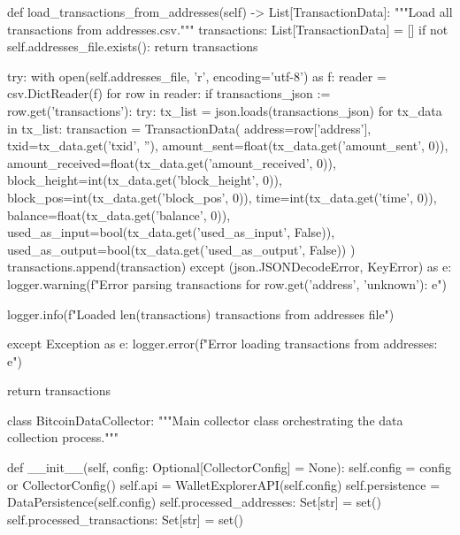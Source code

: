 \begin{codelisting}[language=Python, caption=Основной скрипт сбора данных]
    def load_transactions_from_addresses(self) -> List[TransactionData]:
        """Load all transactions from addresses.csv."""
        transactions: List[TransactionData] = []
        if not self.addresses_file.exists():
            return transactions
            
        try:
            with open(self.addresses_file, 'r', encoding='utf-8') as f:
                reader = csv.DictReader(f)
                for row in reader:
                    if transactions_json := row.get('transactions'):
                        try:
                            tx_list = json.loads(transactions_json)
                            for tx_data in tx_list:
                                transaction = TransactionData(
                                    address=row['address'],
                                    txid=tx_data.get('txid', ''),
                                    amount_sent=float(tx_data.get('amount_sent', 0)),
                                    amount_received=float(tx_data.get('amount_received', 0)),
                                    block_height=int(tx_data.get('block_height', 0)),
                                    block_pos=int(tx_data.get('block_pos', 0)),
                                    time=int(tx_data.get('time', 0)),
                                    balance=float(tx_data.get('balance', 0)),
                                    used_as_input=bool(tx_data.get('used_as_input', False)),
                                    used_as_output=bool(tx_data.get('used_as_output', False))
                                )
                                transactions.append(transaction)
                        except (json.JSONDecodeError, KeyError) as e:
                            logger.warning(f"Error parsing transactions for {row.get('address', 'unknown')}: {e}")
                            
            logger.info(f"Loaded {len(transactions)} transactions from addresses file")
            
        except Exception as e:
            logger.error(f"Error loading transactions from addresses: {e}")
            
        return transactions


class BitcoinDataCollector:
    """Main collector class orchestrating the data collection process."""
    
    def __init__(self, config: Optional[CollectorConfig] = None):
        self.config = config or CollectorConfig()
        self.api = WalletExplorerAPI(self.config)
        self.persistence = DataPersistence(self.config)
        self.processed_addresses: Set[str] = set()
        self.processed_transactions: Set[str] = set()
        

\end{codelisting}
